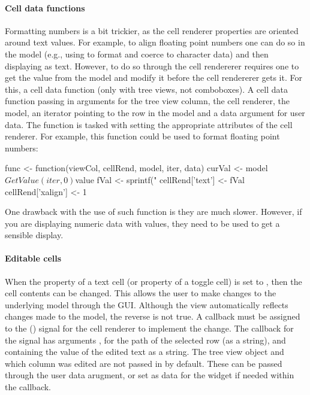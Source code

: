 \paragraph{Cell data functions}
Formatting numbers is a bit trickier, as the cell renderer properties
are oriented around text values. For example, to align floating point
numbers one can do so in the model (e.g., using  to
format and coerce to character data) and then displaying as
text. However, to do so through the cell rendererer requires one to
get the value from the model and modify it before the cell rendererer
gets it. For this, a cell data function (only with tree
views, not comboboxes). A cell data function passing in arguments for the
 tree view column, the cell renderer, the model, an iterator pointing
to the row in the model and a data argument for user data. The
function is tasked with setting the appropriate attributes of the cell
renderer. For example, this function could be used to format floating
point numbers:
\begin{Schunk}
\begin{Sinput}
 func <- function(viewCol, cellRend, model, iter, data) {
   curVal <- model$GetValue(iter, 0)$value
   fVal <- sprintf("%
   cellRend['text'] <- fVal
   cellRend['xalign'] <- 1
 }
\end{Sinput}
\end{Schunk}
One drawback with the use of such function is they are much
slower. However, if you are displaying numeric data with 
values, they need to be used to get a sensible display.


\paragraph{Editable cells} When the  property of a text
cell (or  property of a toggle cell) is set to
, then the cell contents can be changed. This allows the
user to make changes to the underlying model through the GUI. Although
the view automatically reflects changes made to the model, the reverse
is not true. A callback must be assigned to the 
() signal for the cell renderer to implement the
change. The callback for the  signal has arguments
,  for the path of the selected row (as a
string), and  containing the value of the edited text
as a string. The tree view object and which column was edited are not
passed in by default. These can be passed through the user data
arugment, or set as data for the widget if needed within the callback.

